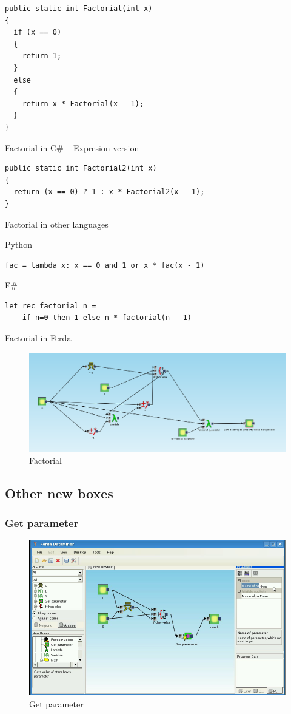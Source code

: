 \documentclass[a4paper,12pt]{book}
\begin{document}
\begin{verbatim}
public static int Factorial(int x)
{
  if (x == 0)
  {
    return 1;
  }
  else
  {
    return x * Factorial(x - 1);
  }
}
\end{verbatim}
	
Factorial in C\# -- Expresion version

\begin{verbatim}
public static int Factorial2(int x)
{
  return (x == 0) ? 1 : x * Factorial2(x - 1);
}
\end{verbatim}

Factorial in other languages

Python
\begin{verbatim}
fac = lambda x: x == 0 and 1 or x * fac(x - 1)
\end{verbatim}

F\#
\begin{verbatim}
let rec factorial n =
    if n=0 then 1 else n * factorial(n - 1)
\end{verbatim}
	
Factorial in Ferda
\begin{figure}
\includegraphics[width=12cm]{faktorial}
	\caption{Factorial}
\end{figure}

\subsection{Other new boxes}
\subsubsection{Get parameter}
\begin{figure}
\includegraphics[width=12cm]{getParameter2.png}
	\caption{Get parameter}
\end{figure}
\end{document}

